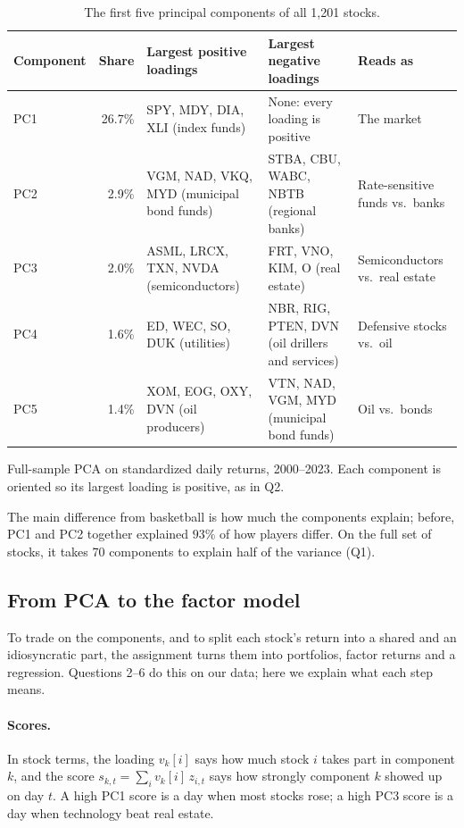 \documentclass[11pt,letterpaper]{article}
\begin{document}
\begin{table}[!htbp]
    \centering
    \caption{The first five principal components of all 1,201 stocks.}
    \label{tab:primer-full}
    \begin{tabular}{L{0.14}R{0.08}L{0.26}L{0.26}L{0.26}}
        \toprule
        Component & Share & Largest positive loadings & Largest negative loadings & Reads as \\
        \midrule
        PC1 & 26.7\% & SPY, MDY, DIA, XLI (index funds) & None: every loading is positive & The market \\
        \addlinespace
        PC2 & 2.9\% & VGM, NAD, VKQ, MYD (municipal bond funds) & STBA, CBU, WABC, NBTB (regional banks) & Rate-sensitive funds vs.\ banks \\
        \addlinespace
        PC3 & 2.0\% & ASML, LRCX, TXN, NVDA (semiconductors) & FRT, VNO, KIM, O (real estate) & Semiconductors vs.\ real estate \\
        \addlinespace
        PC4 & 1.6\% & ED, WEC, SO, DUK (utilities) & NBR, RIG, PTEN, DVN (oil drillers and services) & Defensive stocks vs.\ oil \\
        \addlinespace
        PC5 & 1.4\% & XOM, EOG, OXY, DVN (oil producers) & VTN, NAD, VGM, MYD (municipal bond funds) & Oil vs.\ bonds \\
        \bottomrule
    \end{tabular}
    \par\smallskip\noindent
    Full-sample PCA on standardized daily returns, 2000--2023. Each
    component is oriented so its largest loading is positive, as in Q2.
\end{table}
The main difference from basketball is how much the components explain; before, PC1 and PC2
together explained $93\%$ of how players differ. On the full set of stocks, it takes 70
components to explain half of the variance (Q1).

\subsection{From PCA to the factor model}
To trade on the components, and to split each stock's return into a
shared and an idiosyncratic part, the assignment turns them into
portfolios, factor returns and a regression. Questions 2--6 do this on
our data; here we explain what each step means.

\paragraph{Scores.} In stock terms, the loading $v_k[i]$ says how much
stock $i$ takes part in component $k$, and the score
$s_{k,t}=\sum_i v_k[i]\,z_{i,t}$ says how strongly component $k$ showed up
on day $t$. A high PC1 score is a day when most stocks rose; a high PC3
score is a day when technology beat real estate.
\end{document}
